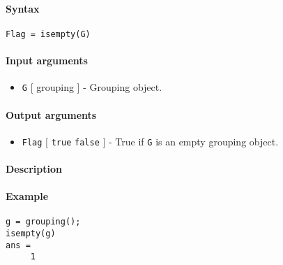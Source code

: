 


	\paragraph{Syntax}\label{syntax}

\begin{verbatim}
Flag = isempty(G)
\end{verbatim}

\paragraph{Input arguments}\label{input-arguments}

\begin{itemize}
\itemsep1pt\parskip0pt
\item
  \texttt{G} {[} grouping {]} - Grouping object.
\end{itemize}

\paragraph{Output arguments}\label{output-arguments}

\begin{itemize}
\itemsep1pt\parskip0pt
\item
  \texttt{Flag} {[} \texttt{true} \textbar{} \texttt{false} {]} - True
  if \texttt{G} is an empty grouping object.
\end{itemize}

\paragraph{Description}\label{description}

\paragraph{Example}\label{example}

\begin{verbatim}
g = grouping();
isempty(g)
ans = 
     1
\end{verbatim}


